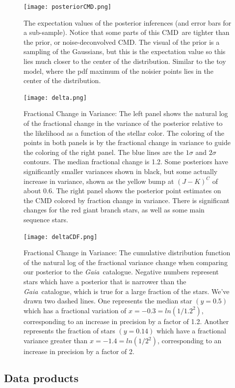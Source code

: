 \documentclass[modern]{aastex61}
\newcommand{\acronym}[1]{{\small{#1}}}
\newcommand{\project}[1]{\textsl{#1}}
\newcommand{\gaia}{\project{Gaia}}
\newcommand{\cmd}{\acronym{CMD}}
\begin{document}
\begin{figure}
\centering
  \texttt{[image: posteriorCMD.png]}
\caption{The expectation values of the posterior inferences (and error
  bars for a sub-sample). Notice that some parts of this \cmd\ are
  tighter than the prior, or noise-deconvolved \cmd. The visual of the
  prior is a sampling of the Gaussians, but this is the expectation
  value so this lies much closer to the center of the
  distribution. Similar to the toy model, where the pdf maximum of the
  noisier points lies in the center of the distribution.}
\label{fig:posteriorCMD}
\end{figure}

\begin{figure}
\centering
\texttt{[image: delta.png]}
\caption{Fractional Change in Variance: The left panel shows the natural log of the fractional change in the variance of the posterior relative to the likelihood as a function of the stellar color. The coloring of the points in both panels is by the fractional change in variance to guide the coloring of the right panel. The blue lines are the $1\sigma$ and $2\sigma$ contours. The median fractional change is 1.2. Some posteriors have significantly smaller variances shown in black, but some actually increase in variance, shown as the yellow bump at $(J-K)^C$ of about 0.6. The right panel shows the posterior point estimates on the CMD colored by fraction change in variance. There is significant changes for the red giant branch stars, as well as some main sequence stars.}
\label{fig:delta}
\end{figure}

\begin{figure}
\centering
\texttt{[image: deltaCDF.png]}
\caption{Fractional Change in Variance: The cumulative distribution function of the natural log of the fractional variance change when comparing our posterior to the \gaia\ catalogue. Negative numbers represent stars which have a posterior that is narrower than the \gaia\ catalogue, which is true for a large fraction of the stars. We've drawn two dashed lines. One represents the median star $(y=0.5)$ which has a fractional variation of $x=-0.3=ln(1/1.2^2)$, corresponding to an increase in precision by a factor of 1.2. Another represents the fraction of stars $(y=0.14)$ which have a fractional variance greater than $x=-1.4=ln(1/2^2)$, corresponding to an increase in precision by a factor of 2.}
\label{fig:deltaCDF}
\end{figure}

\subsection{Data products}
\end{document}
